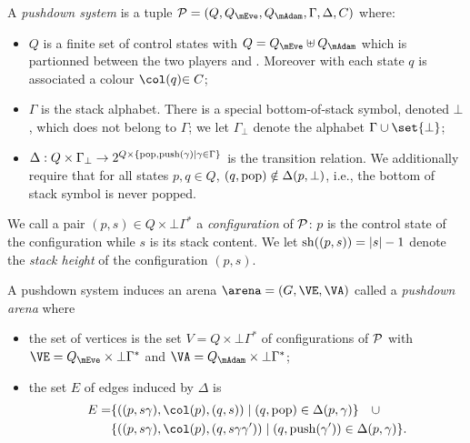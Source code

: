 A \emph{pushdown system} is a tuple $\PDS = (Q,Q_{\mEve}, Q_{\mAdam}, \Gamma,\Delta,C)$ 
where:
\begin{itemize} 
	\item $Q$ is a finite set of control states with $Q = Q_{\mEve} \uplus Q_{\mAdam}$ which is partionned between the two players \Eve and \Adam. Moreover with each state $q$ is associated a colour $\pdscol{q} \acchanged{\in C}$;	\item $\Gamma$ is the stack alphabet. There is a special bottom-of-stack symbol, denoted $\bot$, which does not belong to $\Gamma$; we let $\Gamma_\bot$ denote the alphabet $\Gamma \cup \set{\bot}$;
	\item $\Delta:Q\times \Gamma_\bot\rightarrow 2^{Q\times\{\mathrm{pop},\mathrm{push}(\gamma)\mid \gamma\in\Gamma\}}$ is the transition relation. We additionally require that for all states $p,q\in Q$, $(q,\mathrm{pop})\notin\Delta(p,\bot)$, i.e., the bottom of stack symbol is never popped.
\end{itemize}

We call a pair $(p,s)\in Q \times \bot\Gamma^*$ a \emph{configuration} of $\mathcal{P}$: $p$ is the control state of the configuration while $s$ is its stack content. We let $\mathrm{sh}((p,s))=|s|-1$ denote the \emph{stack height} of the  configuration $(p,s)$. 


A pushdown system induces an arena $\arena = (G,\VE,\VA)$ called a \emph{pushdown arena} where
\begin{itemize}
	\item the set of vertices is the set $V = Q \times \bot\Gamma^* $ of configurations of $\mathcal{P}$ with $\VE = Q_{\mEve} \times \bot\Gamma^*$ 
	and $\VA = Q_{\mAdam} \times \bot\Gamma^* $;
	\item the set $E$ of edges induced by $\Delta$ is
\begin{equation*}
\begin{split}
	E  = & \{((p,s\gamma),\pdscol{p},(q,s)) \mid (q,\pop)\in\Delta(p,\gamma)\}\quad \cup \\ 
	&  \{((p,s\gamma),\pdscol{p},(q,s\gamma\gamma')) \mid (q,\push{\gamma'})\in\Delta(p,\gamma)\}.
\end{split}	
\end{equation*}
\end{itemize}

